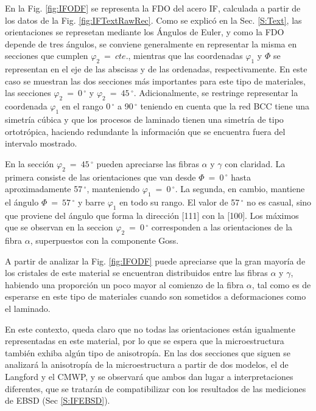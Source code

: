 En la Fig. \ref{fig:IFODF} se representa la FDO del acero IF, calculada a partir de los datos de la Fig. \ref{fig:IFTextRawRec}.
Como se explicó en la Sec. \ref{S:Text}, las orientaciones se represetan mediante los Ángulos de Euler, y como la FDO depende de tres ángulos, se conviene generalmente en representar la misma en secciones que cumplen $\varphi_2 \ = \ cte.$, mientras que las coordenadas $\varphi_1$ y $\Phi$ se representan en el eje de las abscisas y de las ordenadas, respectivamente.
En este caso se muestran las dos secciones más importantes para este tipo de materiales, las secciones $\varphi_2 \ = \ 0$\,$^{\circ}$ y $\varphi_2 \ = \ 45$\,$^{\circ}$.
Adicionalmente, se restringe representar la coordenada $\varphi_1$ en el rango 0\,$^{\circ}$ a 90\,$^{\circ}$ teniendo en cuenta que la red BCC tiene una simetría cúbica y que los procesos de laminado tienen una simetría de tipo ortotrópica, haciendo redundante la información que se encuentra fuera del intervalo mostrado.

En la sección $\varphi_2 \ = \ 45$\,$^{\circ}$ pueden apreciarse las fibras $\alpha$ y $\gamma$ con claridad. 
La primera consiste de las orientaciones que van desde $\Phi \ = \ 0$\,$^{\circ}$ hasta aproximadamente 57\,$^{\circ}$, manteniendo $\varphi_1 \ = \ 0$\,$^{\circ}$.
La segunda, en cambio, mantiene el ángulo $\Phi \ = \ 57$\,$^{\circ}$ y barre $\varphi_1$ en todo su rango. El valor de 57\,$^{\circ}$ no es casual, sino que proviene del ángulo que forma la dirección [111] con la [100].
Los máximos que se observan en la seccion $\varphi_2 \ = \ 0$\,$^{\circ}$ corresponden a las orientaciones de la fibra $\alpha$, superpuestos con la componente Goss.

A partir de analizar la Fig. \ref{fig:IFODF} puede apreciarse que la gran mayoría de los cristales de este material se encuentran distribuidos entre las fibras $\alpha$ y $\gamma$, habiendo una proporción un poco mayor al comienzo de la fibra $\alpha$, tal como es de esperarse en este tipo de materiales cuando son sometidos a deformaciones como el laminado.

En este contexto, queda claro que no todas las orientaciones están igualmente representadas en este material, por lo que se espera que la microestructura también exhiba algún tipo de anisotropía.
En las dos secciones que siguen se analizará la anisotropía de la microestructura a partir de dos modelos, el de Langford y el CMWP, y se observará que ambos dan lugar a interpretaciones diferentes, que se tratarán de compatibilizar con los resultados de las mediciones de EBSD (Sec \ref{S:IFEBSD}).

